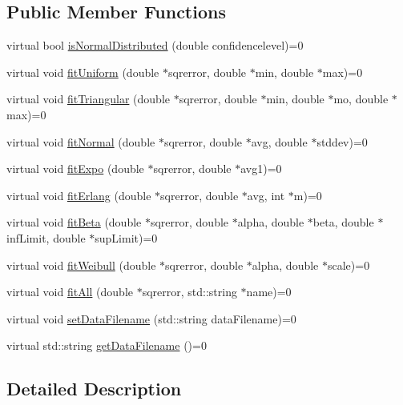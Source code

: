 \subsection*{Public Member Functions}
\begin{DoxyCompactItemize}
\item 
virtual bool \hyperlink{class_fitter__if_a53e98635fcdee314e8ade8089f41ddad}{is\-Normal\-Distributed} (double confidencelevel)=0
\item 
virtual void \hyperlink{class_fitter__if_adec53dfede4bdb31b175e57e6a2c2fc7}{fit\-Uniform} (double $\ast$sqrerror, double $\ast$min, double $\ast$max)=0
\item 
virtual void \hyperlink{class_fitter__if_a2bfc41c6a8044520aeafb2c5c71fe570}{fit\-Triangular} (double $\ast$sqrerror, double $\ast$min, double $\ast$mo, double $\ast$max)=0
\item 
virtual void \hyperlink{class_fitter__if_af95b4de00b7ed5d67b10d9ee458379bf}{fit\-Normal} (double $\ast$sqrerror, double $\ast$avg, double $\ast$stddev)=0
\item 
virtual void \hyperlink{class_fitter__if_a5ab5ac575b736bb720e6a40b334de5a3}{fit\-Expo} (double $\ast$sqrerror, double $\ast$avg1)=0
\item 
virtual void \hyperlink{class_fitter__if_aead0c465573cdd42e63e2b175c0bc929}{fit\-Erlang} (double $\ast$sqrerror, double $\ast$avg, int $\ast$m)=0
\item 
virtual void \hyperlink{class_fitter__if_a8ea1e6520f191368274fec5ab8e5f182}{fit\-Beta} (double $\ast$sqrerror, double $\ast$alpha, double $\ast$beta, double $\ast$inf\-Limit, double $\ast$sup\-Limit)=0
\item 
virtual void \hyperlink{class_fitter__if_a40c5bc2e953e683751743cf06df077c6}{fit\-Weibull} (double $\ast$sqrerror, double $\ast$alpha, double $\ast$scale)=0
\item 
virtual void \hyperlink{class_fitter__if_a819a5ca8715ba4be30d2c7a3957aa467}{fit\-All} (double $\ast$sqrerror, std\-::string $\ast$name)=0
\item 
virtual void \hyperlink{class_fitter__if_aa2d2f13548a09a2f727a4190a6b9c2dd}{set\-Data\-Filename} (std\-::string data\-Filename)=0
\item 
virtual std\-::string \hyperlink{class_fitter__if_a3c6926020b1224a960890fe308abcc86}{get\-Data\-Filename} ()=0
\end{DoxyCompactItemize}


\subsection{Detailed Description}


